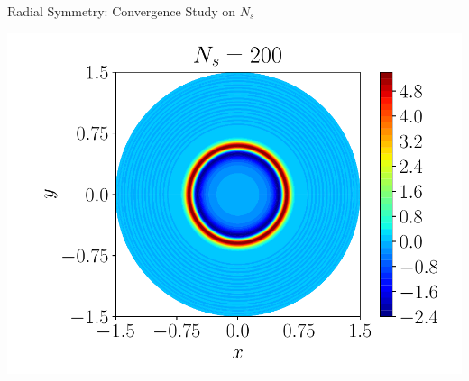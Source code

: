 \documentclass{beamer}
\begin{document}
\begin{frame}{Radial Symmetry: Convergence Study on $N_s$}
{	\begin{minipage}{0.38\linewidth}
		\includegraphics[width=\linewidth]{figures/Physical_Solution_Symmetric_200.pdf} 
	\end{minipage}
	}
	\centering
\end{frame}
\end{document}
